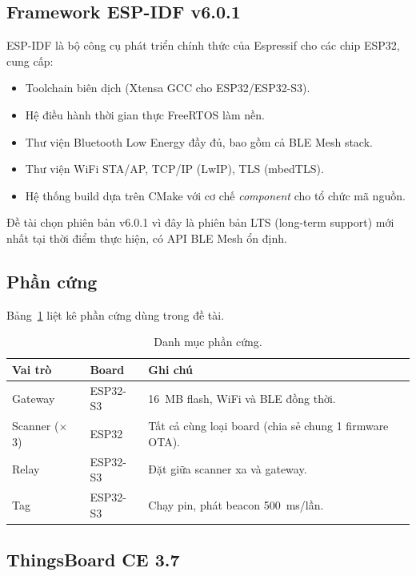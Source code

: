 \subsection{Framework ESP-IDF v6.0.1}

ESP-IDF là bộ công cụ phát triển chính thức của Espressif cho các chip ESP32, cung cấp:

\begin{itemize}
    \item Toolchain biên dịch (Xtensa GCC cho ESP32/ESP32-S3).
    \item Hệ điều hành thời gian thực FreeRTOS làm nền.
    \item Thư viện Bluetooth Low Energy đầy đủ, bao gồm cả BLE Mesh stack.
    \item Thư viện WiFi STA/AP, TCP/IP (LwIP), TLS (mbedTLS).
    \item Hệ thống build dựa trên CMake với cơ chế \textit{component} cho tổ chức mã nguồn.
\end{itemize}

Đề tài chọn phiên bản v6.0.1 vì đây là phiên bản LTS (long-term support) mới nhất tại thời điểm thực hiện, có API BLE Mesh ổn định.

\subsection{Phần cứng}

Bảng~\ref{tab:hardware} liệt kê phần cứng dùng trong đề tài.

\begin{table}[htp]
    \centering
    \caption{Danh mục phần cứng.}
    \label{tab:hardware}
    \begin{tabular}{lll}
        \hline
        \textbf{Vai trò} & \textbf{Board} & \textbf{Ghi chú} \\
        \hline
        Gateway & ESP32-S3 & 16~MB flash, WiFi và BLE đồng thời. \\
        Scanner ($\times$ 3) & ESP32 & Tất cả cùng loại board (chia sẻ chung 1 firmware OTA). \\
        Relay & ESP32-S3 & Đặt giữa scanner xa và gateway. \\
        Tag & ESP32-S3 & Chạy pin, phát beacon 500~ms/lần. \\
        \hline
    \end{tabular}
\end{table}

\subsection{ThingsBoard CE 3.7}

